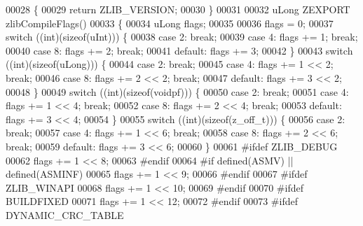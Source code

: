 \begin{DoxyCode}
00028 \{
00029     \textcolor{keywordflow}{return} ZLIB\_VERSION;
00030 \}
00031 
00032 uLong ZEXPORT zlibCompileFlags()
00033 \{
00034     uLong flags;
00035 
00036     flags = 0;
00037     \textcolor{keywordflow}{switch} ((\textcolor{keywordtype}{int})(\textcolor{keyword}{sizeof}(uInt))) \{
00038     \textcolor{keywordflow}{case} 2:     \textcolor{keywordflow}{break};
00039     \textcolor{keywordflow}{case} 4:     flags += 1;     \textcolor{keywordflow}{break};
00040     \textcolor{keywordflow}{case} 8:     flags += 2;     \textcolor{keywordflow}{break};
00041     \textcolor{keywordflow}{default}:    flags += 3;
00042     \}
00043     \textcolor{keywordflow}{switch} ((\textcolor{keywordtype}{int})(\textcolor{keyword}{sizeof}(uLong))) \{
00044     \textcolor{keywordflow}{case} 2:     \textcolor{keywordflow}{break};
00045     \textcolor{keywordflow}{case} 4:     flags += 1 << 2;        \textcolor{keywordflow}{break};
00046     \textcolor{keywordflow}{case} 8:     flags += 2 << 2;        \textcolor{keywordflow}{break};
00047     \textcolor{keywordflow}{default}:    flags += 3 << 2;
00048     \}
00049     \textcolor{keywordflow}{switch} ((\textcolor{keywordtype}{int})(\textcolor{keyword}{sizeof}(voidpf))) \{
00050     \textcolor{keywordflow}{case} 2:     \textcolor{keywordflow}{break};
00051     \textcolor{keywordflow}{case} 4:     flags += 1 << 4;        \textcolor{keywordflow}{break};
00052     \textcolor{keywordflow}{case} 8:     flags += 2 << 4;        \textcolor{keywordflow}{break};
00053     \textcolor{keywordflow}{default}:    flags += 3 << 4;
00054     \}
00055     \textcolor{keywordflow}{switch} ((\textcolor{keywordtype}{int})(\textcolor{keyword}{sizeof}(z\_off\_t))) \{
00056     \textcolor{keywordflow}{case} 2:     \textcolor{keywordflow}{break};
00057     \textcolor{keywordflow}{case} 4:     flags += 1 << 6;        \textcolor{keywordflow}{break};
00058     \textcolor{keywordflow}{case} 8:     flags += 2 << 6;        \textcolor{keywordflow}{break};
00059     \textcolor{keywordflow}{default}:    flags += 3 << 6;
00060     \}
00061 \textcolor{preprocessor}{#ifdef ZLIB\_DEBUG}
00062     flags += 1 << 8;
00063 \textcolor{preprocessor}{#endif}
00064 \textcolor{preprocessor}{#if defined(ASMV) || defined(ASMINF)}
00065     flags += 1 << 9;
00066 \textcolor{preprocessor}{#endif}
00067 \textcolor{preprocessor}{#ifdef ZLIB\_WINAPI}
00068     flags += 1 << 10;
00069 \textcolor{preprocessor}{#endif}
00070 \textcolor{preprocessor}{#ifdef BUILDFIXED}
00071     flags += 1 << 12;
00072 \textcolor{preprocessor}{#endif}
00073 \textcolor{preprocessor}{#ifdef DYNAMIC\_CRC\_TABLE}

\end{DoxyCode}
